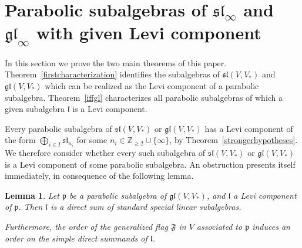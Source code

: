 \documentclass{amsart}
\newtheorem{lemma}[theorem]{Lemma}
\theoremstyle{definition}
\theoremstyle{remark}
\numberwithin{equation}{section}
\newcommand {\Z} {\mathbb{Z}}
\def\gl{\mathfrak {gl}}
\def\l{\mathfrak {l}}
\def\p{\mathfrak {p}}
\def\sl{\mathfrak{sl}}
\def\F{\mathfrak{F}}
\begin{document}
\section{Parabolic subalgebras of $\sl_\infty$ and $\gl_\infty$ with given Levi component}


In this section we prove the two main theorems of this paper.  Theorem~\ref{firstcharacterization} identifies the subalgebras of $\sl(V,V_*)$ and $\gl(V,V_*)$ which can be realized as the Levi component of a parabolic subalgebra.  Theorem~\ref{iffgl} characterizes all parabolic subalgebras of which a given subalgebra $\l$ is a Levi component.

Every parabolic subalgebra of $\sl(V,V_*)$ or $\gl(V,V_*)$ has a Levi component of the form $\bigoplus_{i \in I} \sl_{n_i}$ for some $n_i \in \Z_{\geq 2} \cup \{ \infty \}$, by Theorem~\ref{strongerhypotheses}.  We therefore consider whether every such subalgebra of $\sl(V,V_*)$ or $\gl(V,V_*)$ is a Levi component of some parabolic subalgebra.  An obstruction presents itself immediately, in consequence of the following lemma.


\begin{lemma} \label{notdiagonal}
Let $\p$ be a parabolic subalgebra of $\gl(V,V_*)$, and $\l$ a Levi component of $\p$.  Then $\l$ is a direct sum of standard special linear subalgebras.  

Furthermore, the order of the generalized flag $\F$ in $V$ associated to $\p$ induces an order on the simple direct summands of $\l$.
\end{lemma}
\end{document}
